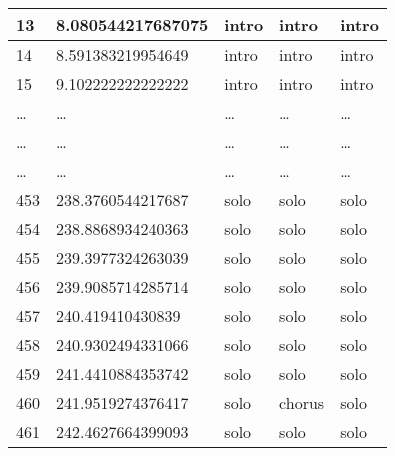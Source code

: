 \begin{table}[t]
\begin{tabular}{|l|l|l|l|l|}
    13                   & 8.080544217687075    & intro                & intro                    & intro                   \\ \hline
    14                   & 8.591383219954649    & intro                & intro                    & intro                   \\ \hline
    15                   & 9.102222222222222    & intro                & intro                    & intro                   \\ \hline
    \dots                & \dots                & \dots                & \dots                    & \dots                   \\ \hline
    \dots                & \dots                & \dots                & \dots                    & \dots                   \\ \hline
    \dots                & \dots                & \dots                & \dots                    & \dots                   \\ \hline
    453                  & 238.3760544217687    & solo                 & solo                     & solo                    \\ \hline
    454                  & 238.8868934240363    & solo                 & solo                     & solo                    \\ \hline
    455                  & 239.3977324263039    & solo                 & solo                     & solo                    \\ \hline
    456                  & 239.9085714285714    & solo                 & solo                     & solo                    \\ \hline
    457                  & 240.419410430839     & solo                 & solo                     & solo                    \\ \hline
    458                  & 240.9302494331066    & solo                 & solo                     & solo                    \\ \hline
    459                  & 241.4410884353742    & solo                 & solo                     & solo                    \\ \hline
    460                  & 241.9519274376417    & solo                 & chorus                   & solo                    \\ \hline
    461                  & 242.4627664399093    & solo                 & solo                     & solo                    \\ \hline

\end{tabular}
\end{table}
